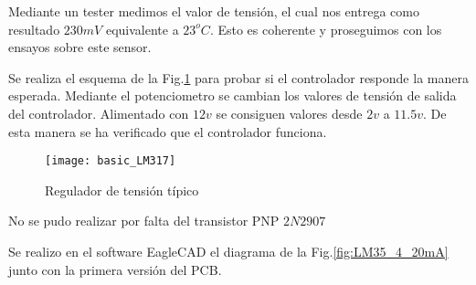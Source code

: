 Mediante un tester medimos el valor de tensión, el cual nos entrega como resultado 
$230mV$ equivalente a $23^oC$. Esto es coherente y proseguimos con los ensayos sobre este
sensor.

Se realiza el esquema de la Fig.\ref{fig:basic_LM317} para probar si el
controlador responde la manera esperada. Mediante el potenciometro se cambian los valores
de tensión de salida del controlador. Alimentado con $12v$ se consiguen valores desde
$2v$ a $11.5v$. De esta manera se ha verificado que el controlador funciona.

\begin{figure}[H] %
  \begin{center}
  \texttt{[image: basic\_LM317]}
  \end{center}
  \caption{Regulador de tensión típico }
  \label{fig:basic_LM317}
\end{figure}


No se pudo realizar por falta del transistor PNP $2N2907$

Se realizo en el software EagleCAD el diagrama de la Fig.\ref{fig:LM35_4_20mA} junto con 
la primera versión del PCB.